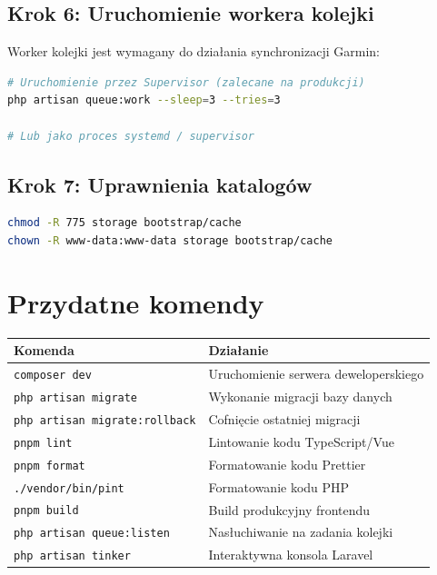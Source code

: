 \documentclass[12pt,a4paper]{report}
\begin{document}
\subsection{Krok 6: Uruchomienie workera kolejki}

Worker kolejki jest wymagany do działania synchronizacji Garmin:

\begin{lstlisting}[language=bash, numbers=none]
# Uruchomienie przez Supervisor (zalecane na produkcji)
php artisan queue:work --sleep=3 --tries=3

# Lub jako proces systemd / supervisor
\end{lstlisting}

\subsection{Krok 7: Uprawnienia katalogów}

\begin{lstlisting}[language=bash, numbers=none]
chmod -R 775 storage bootstrap/cache
chown -R www-data:www-data storage bootstrap/cache
\end{lstlisting}

\section{Przydatne komendy}

\begin{center}
\begin{tabular}{|l|l|}
\hline
\textbf{Komenda}                      & \textbf{Działanie}                       \\
\hline
\texttt{composer dev}                 & Uruchomienie serwera deweloperskiego      \\
\texttt{php artisan migrate}          & Wykonanie migracji bazy danych            \\
\texttt{php artisan migrate:rollback} & Cofnięcie ostatniej migracji              \\
\texttt{pnpm lint}                    & Lintowanie kodu TypeScript/Vue            \\
\texttt{pnpm format}                  & Formatowanie kodu Prettier                \\
\texttt{./vendor/bin/pint}            & Formatowanie kodu PHP                     \\
\texttt{pnpm build}                   & Build produkcyjny frontendu               \\
\texttt{php artisan queue:listen}     & Nasłuchiwanie na zadania kolejki          \\
\texttt{php artisan tinker}           & Interaktywna konsola Laravel              \\
\hline
\end{tabular}
\end{center}
\end{document}
